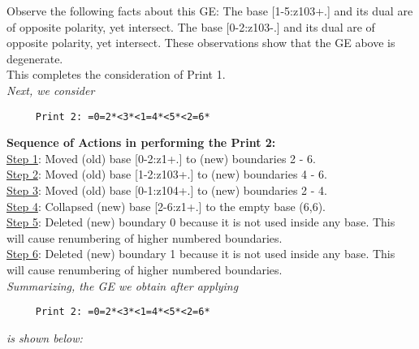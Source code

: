 \documentclass[final]{article}
\begin{document}
Observe the following facts about this GE:
The base [1-5:z103+.]  and its dual are of opposite polarity, yet intersect.  The base [0-2:z103-.]  and its dual are of opposite polarity, yet intersect.  These observations show that the GE above is degenerate.\\[0.1in]
This completes the consideration of Print 1.\\[0.1in]
{\em Next, we consider}
\begin{verbatim}
     Print 2: =0=2*<3*<1=4*<5*<2=6*
\end{verbatim}
{\bf Sequence of Actions in performing the Print 2:}\\
{\underline{Step 1}:} Moved (old) base [0-2:z1+.]  to (new) boundaries 2 - 6.\\
{\underline{Step 2}:} Moved (old) base [1-2:z103+.]  to (new) boundaries 4 - 6.\\
{\underline{Step 3}:} Moved (old) base [0-1:z104+.]  to (new) boundaries 2 - 4.\\
{\underline{Step 4}:} Collapsed (new) base [2-6:z1+.]  to the empty base (6,6).
\\
{\underline{Step 5}:} Deleted (new) boundary 0 because it is not used inside any base.  This will cause renumbering of higher numbered boundaries.
\\
{\underline{Step 6}:} Deleted (new) boundary 1 because it is not used inside any base.  This will cause renumbering of higher numbered boundaries.
\\[0.1in]
{\em Summarizing, the GE we obtain after applying}
\begin{verbatim}
     Print 2: =0=2*<3*<1=4*<5*<2=6*
\end{verbatim}
{\em is shown below:}
\end{document}
